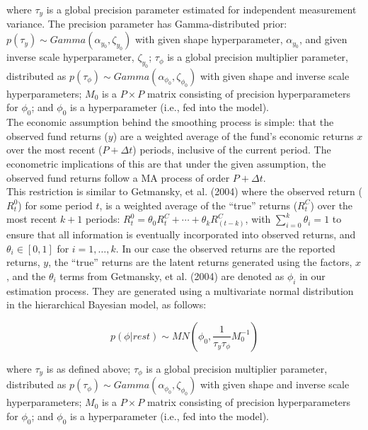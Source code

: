 \documentclass{ledger}
\begin{document}
where $\tau_y$ is a global precision parameter estimated for independent measurement variance. The precision parameter has Gamma-distributed prior: $p( \tau_y ) \sim Gamma \left( \alpha_{y_0}, \zeta_{y_0} \right)$ with given shape hyperparameter, $\alpha_{y_0}$, and given inverse scale hyperparameter, $\zeta_{y_0}$;  $\tau_\phi$ is a global precision multiplier parameter, distributed as $p( \tau_\phi ) \sim Gamma \left(\alpha_{\phi_0}, \zeta_{\phi_0} \right)$ with given shape and inverse scale hyperparameters; $M_0$ is a $P \times P$ matrix consisting of precision hyperparameters for $\phi_0$; and $\phi_0$ is a hyperparameter (i.e., fed into the model). \\

The economic assumption behind the smoothing process is simple: that the observed fund returns ($y$) are a weighted average of the fund’s economic returns $x$ over the most recent ($P + \Delta t$) periods, inclusive of the current period. The econometric implications of this are that under the given assumption, the observed fund returns follow a MA process of order $P + \Delta t$. \\

This restriction is similar to Getmansky, et al. (2004) where the observed return ($R_t^0$) for some period $t$, is a weighted average of the 	``true'' returns ($R_t^C$) over the most recent $k+1$ periods: $R_t^0 = \theta_0 R_t^C + \cdots + \theta_k R_(t-k)^C$, with $\sum_{i=0}^k \theta_i  = 1$ to ensure that all information is eventually incorporated into observed returns, and $\theta_i \in [0,1]$ for $i = 1, \ldots, k$. In our case the observed returns are the reported returns, $y$, the ``true'' returns are the latent returns generated using the factors, $x$, and the $\theta_i$ terms from Getmansky, et al. (2004) are denoted as $\phi_i$ in our estimation process. They are generated using a multivariate normal distribution in the hierarchical Bayesian model, as follows:

\begin{equation}
\label{eq:phi_dist}
	p\left(\phi|rest\right) \sim MN\left(\phi_{0},\frac{1}{\tau_{y}\tau_{\phi}}M_{0}^{-1}\right)
\end{equation}

where $\tau_y$ is as defined above; $\tau_\phi$ is a global precision multiplier parameter, distributed as $p( \tau_\phi ) \sim Gamma \left(\alpha_{\phi_0}, \zeta_{\phi_0} \right)$ with given shape and inverse scale hyperparameters; $M_0$ is a $P \times P$ matrix consisting of precision hyperparameters for $\phi_0$; and $\phi_0$ is a hyperparameter (i.e., fed into the model). 
\end{document}
